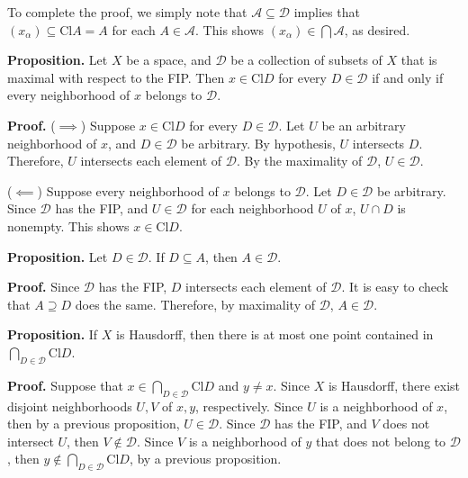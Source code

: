\documentclass[12pt]{article}
\begin{document}
To complete the proof, we simply note that $\mathcal{A} \subseteq \mathcal{D}$ implies that $(x_\alpha) \subseteq \text{Cl} A = A$ for each $A \in \mathcal{A}$. This shows $(x_\alpha) \in \bigcap \mathcal{A}$, as desired.


\vspace{2 \baselineskip}


\textbf{Proposition. } Let $X$ be a space, and $\mathcal{D}$ be a collection of subsets of $X$ that is maximal with respect to the FIP. Then $x \in \text{Cl} D$ for every $D \in \mathcal{D}$ if and only if every neighborhood of $x$ belongs to $\mathcal{D}$.

\textbf{Proof. } ($\implies$) Suppose $x \in \text{Cl} D$ for every $D \in \mathcal{D}$. Let $U$ be an arbitrary neighborhood of $x$, and $D \in \mathcal{D}$ be arbitrary. By hypothesis, $U$ intersects $D$. Therefore, $U$ intersects each element of $\mathcal{D}$. By the maximality of $\mathcal{D}$, $U \in \mathcal{D}$.

($\impliedby$) Suppose every neighborhood of $x$ belongs to $\mathcal{D}$. Let $D \in \mathcal{D}$ be arbitrary. Since $\mathcal{D}$ has the FIP, and $U \in \mathcal{D}$ for each neighborhood $U$ of $x$, $U \cap D$ is nonempty. This shows $x \in \text{Cl} D$.

\vspace{1 \baselineskip}

\textbf{Proposition. } Let $D \in \mathcal{D}$. If $D \subseteq A$, then $A \in \mathcal{D}$.

\textbf{Proof. } Since $\mathcal{D}$ has the FIP, $D$ intersects each element of $\mathcal{D}$. It is easy to check that $A \supseteq D$ does the same. Therefore, by maximality of $\mathcal{D}$, $A \in \mathcal{D}$.

\vspace{1 \baselineskip}

\textbf{Proposition. } If $X$ is Hausdorff, then there is at most one point contained in $\bigcap_{D \in \mathcal{D}} \text{Cl} D$.

\textbf{Proof. } Suppose that $x \in \bigcap_{D \in \mathcal{D}} \text{Cl} D$ and $y \ne x$. Since $X$ is Hausdorff, there exist disjoint neighborhoods $U, V$ of $x, y$, respectively. Since $U$ is a neighborhood of $x$, then by a previous proposition, $U \in \mathcal{D}$. Since $\mathcal{D}$ has the FIP, and $V$ does not intersect $U$, then $V \notin \mathcal{D}$. Since $V$ is a neighborhood of $y$ that does not belong to $\mathcal{D}$, then $y \notin \bigcap_{D \in \mathcal{D}} \text{Cl} D$, by a previous proposition.
\end{document}
